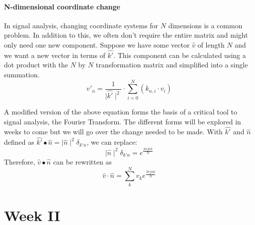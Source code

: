 \documentclass[12pt]{article}
\newcommand{\partcontent}{}
\begin{document}

\subsection{N-dimensional coordinate change}
In signal analysis, changing coordinate systems for $N$ dimensions is a common problem. In addition to this, we often don't require the entire matrix and might only need one new component. Suppose we have some vector $\widehat{v}$ of length $N$ and we want a new vector in terms of $\widehat{k'}$. This component can be calculated using a dot product with the $N$ by $N$ transformation matrix and simplified into a single summation. $$\widehat{v'_n} = \frac{1}{\mid \widehat{k'} \mid ^2} \cdot \sum_{i=0}^{N} (k_{n,i} \cdot v_i) $$

A modified version of the above equation forms the basis of a critical tool to signal analysis, the Fourier Transform. The different forms will be explored in weeks to come but we will go over the change needed to be made. With $\widehat{k'}$ and $\widehat{n}$ defined as $\widehat{k'} \bullet \widehat{n}= \mid\widehat{n}\mid^2\delta_{k'n}$, we can replace: $$\mid\widehat{n}\mid^2\delta_{k'n} = e^\frac{2 \pi jnk}{N}$$ Therefore, $\widehat{v} \bullet \widehat{n} $ can be rewritten as $$\widehat{v} \cdot \widehat{n} = \sum_k^N v_k e^\frac{2 \pi jnk}{N}$$
\noindent\makebox[\linewidth]{\rule{\paperwidth}{0.4pt}}


\part*{Week II}
\renewcommand\partcontent{Week II}
\end{document}
